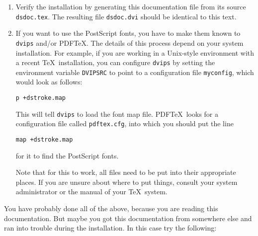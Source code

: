 \documentclass[a4paper]{article}
\begin{document}
\begin{enumerate}
\item Verify the installation by generating this documentation
file from its source \texttt{dsdoc.tex}. The resulting file
\texttt{dsdoc.dvi} should be identical to this text.

\item If you want to use the PostScript fonts, you have to make
  them known to \texttt{dvips} and/or PDF\TeX. The details of
  this process depend on your system installation. For example,
  if you are working in a Unix-style environment with a recent
  \TeX\ installation, you can configure \texttt{dvips} by setting
  the environment variable \texttt{DVIPSRC} to point to a
  configuration file \texttt{myconfig}, which would look as
  follows:
\begin{verbatim}
p +dstroke.map
\end{verbatim}
  This will tell \texttt{dvips} to load the font map file.
  PDF\TeX\ looks for a configuration file called
  \texttt{pdftex.cfg}, into which you should put the line
\begin{verbatim}
map +dstroke.map
\end{verbatim}
  for it to find the PostScript fonts.

  Note that for this to work, all files need to be put into their
  appropriate places. If you are unsure about where to put
  things, consult your system administrator or the manual of your
  \TeX\ system.
\end{enumerate}

You have probably done all of the above, because you are reading
this documentation. But maybe you got this documentation from
somewhere else and ran into trouble during the installation.
In this case try the following:
\end{document}

